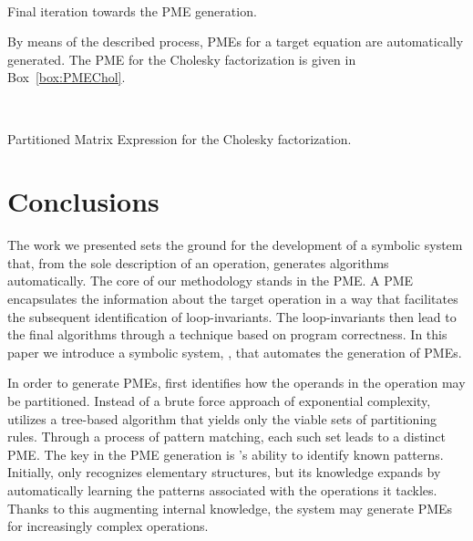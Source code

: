 \documentclass{llncs}
\newcommand{\click}{{\sc{Cl\makebox[.58\width][c]{1}ck}}}
\begin{document}
\begin{mybox}
{\begin{mybox} \centering
\tiny
\renewcommand{\arraystretch}{1.6}
\hspace{-.1cm}
\\\vspace{-.5em}
\hspace{-.1cm}
\caption{Final iteration towards the PME generation.} \label{box:it3}
\end{mybox}

By means of the described process, PMEs for a target equation are automatically
generated. The PME for the Cholesky factorization is given in Box~\ref{box:PMEChol}.

\begin{mybox} \centering
\vspace{-3mm}
	\renewcommand{\arraystretch}{1.4}
	 \\
\vspace{-3mm}
	\caption{Partitioned Matrix Expression for the Cholesky factorization.} \label{box:PMEChol}
\end{mybox}

\section{Conclusions} \label{sec:conclusions}

The work we presented sets the ground for the development of a
symbolic system that, from the sole description of an operation,
generates algorithms automatically. The core of our methodology stands
in the PME.  A PME encapsulates the information about the target
operation in a way that facilitates the subsequent identification of
loop-invariants. The loop-invariants then lead to the final algorithms
through a technique based on program correctness. In this paper we
introduce a symbolic system, \click{}, that automates the generation of
PMEs.

In order to generate PMEs, \click{} first identifies how the op\-er\-ands in the
operation may be partitioned. Instead of a brute force approach of
exponential complexity, \click{} utilizes a tree-based algorithm that
yields only the viable sets of partitioning rules.
Through a process of pattern matching, each such set leads to a distinct PME. 
The key in the PME generation is \click{}'s ability to identify known patterns. 
Initially, \click{} only recognizes elementary structures, but its
knowledge expands by automatically learning the patterns associated
with the operations it tackles. Thanks to this augmenting
internal knowledge, the system may generate PMEs for increasingly
complex operations.

}
\end{mybox}
\end{document}
